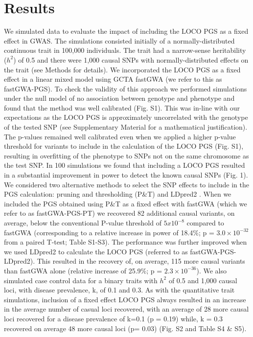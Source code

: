\documentclass[fleqn,10pt]{wlscirep}
\begin{document}
\section*{Results}

We simulated data to evaluate the impact of including the LOCO PGS as a fixed effect in GWAS. The simulations consisted initially of a normally-distributed continuous trait in 100,000 individuals. The trait had a narrow-sense heritability ($h^2$) of 0.5 and there were 1,000 causal SNPs with normally-distributed effects on the trait (see Methods for details). We incorporated the LOCO PGS as a fixed effect in a linear mixed model using GCTA fastGWA \cite{jiang2019resource} (we refer to this as fastGWA-PGS). To check the validity of this approach we performed simulations under the null model of no association between genotype and phenotype and found that the method was well calibrated (Fig. S1). This was in-line with our expectations as the LOCO PGS is approximately uncorrelated with the genotype of the tested SNP (see Supplementary Material for a mathematical justification). The p-values remained well calibrated even when we applied a higher p-value threshold for variants to include in the calculation of the LOCO PGS (Fig. S1), resulting in overfitting of the phenotype to SNPs not on the same chromosome as the test SNP. In 100 simulations we found that including a LOCO PGS resulted in a substantial improvement in power to detect the known causal SNPs (Fig. 1). We considered two alternative methods to select the SNP effects to include in the PGS calculation: pruning and thresholding (P\&T) and LDpred2 \cite{choi2019prsice,LDpred2}. When we included the PGS obtained using P\&T as a fixed effect with fastGWA (which we refer to as  fastGWA-PGS-PT) we recovered 82 additional causal variants, on average, below the conventional P-value threshold of $5x10^{-8}$ compared to fastGWA (corresponding to a relative increase in power of 18.4\%; p = $3.0\times 10^{-32}$ from a paired T-test; Table S1-S3). The performance was further improved when we used LDpred2 to calculate the LOCO PGS  (referred to as fastGWA-PGS-LDpred2). This resulted in the recovery of, on average, 115 more causal variants than fastGWA alone (relative increase of 25.9\%; p = $2.3\times 10^{-36}$). We also simulated case control data for a binary traits with $h^2$ of 0.5 and 1,000 causal loci, with disease prevalence, k, of 0.1 and 0.3. As with the quantitative trait simulations, inclusion of a fixed effect LOCO PGS always resulted in an increase in the average number of casual loci recovered, with an average of 28 more causal loci recovered for a disease prevalence of k=0.1 (p = 0.19) while, k = 0.3 recovered on average 48 more causal loci (p= 0.03) (Fig. S2 and Table S4 \& S5).   
\end{document}
